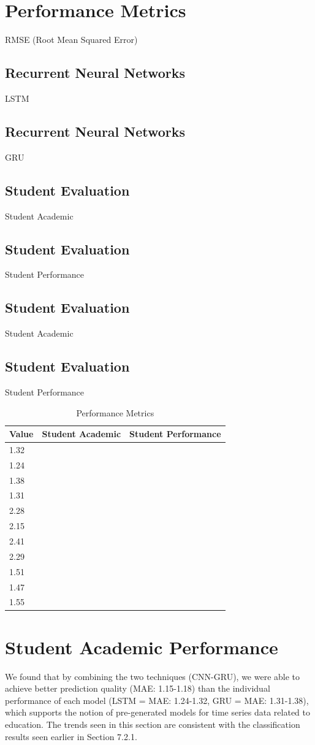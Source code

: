 \documentclass[twocolumn]{svjour3}
\begin{document}
\section{Performance Metrics}
RMSE (Root Mean Squared Error)
\subsection{Recurrent Neural Networks}
LSTM
\subsection{Recurrent Neural Networks}
GRU
\subsection{Student Evaluation}
Student Academic
\subsection{Student Evaluation}
Student Performance
\subsection{Student Evaluation}
Student Academic
\subsection{Student Evaluation}
Student Performance
\begin{table}
\centering
\caption{Performance Metrics}
\begin{tabular}{lll}
\hline
Value & Student Academic & Student Performance \\
\hline
1.32 & & \\
1.24 & & \\
1.38 & & \\
1.31 & & \\
2.28 & & \\
2.15 & & \\
2.41 & & \\
2.29 & & \\
1.51 & & \\
1.47 & & \\
1.55 & & \\
\hline
\end{tabular}
\end{table}

\section{Student Academic Performance}
We found that by combining the two techniques (CNN-GRU), we were able to achieve better prediction quality (MAE: 1.15-1.18) than the individual performance of each model (LSTM = MAE: 1.24-1.32, GRU = MAE: 1.31-1.38), which supports the notion of pre-generated models for time series data related to education. The trends seen in this section are consistent with the classification results seen earlier in Section 7.2.1.
\end{document}
